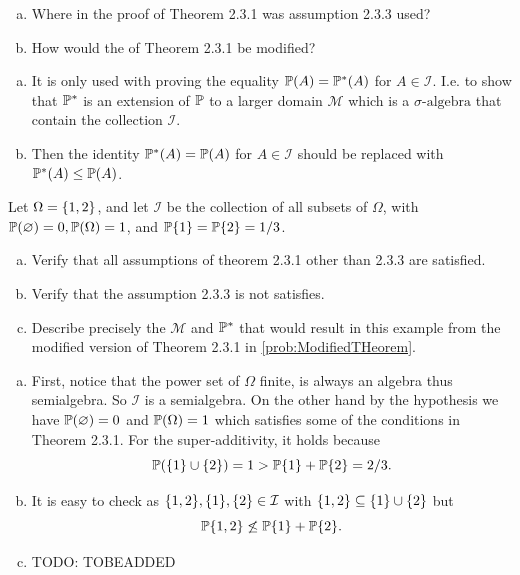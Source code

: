 \begin{problem}
	\label{prob:ModifiedTHeorem}
	\begin{enumerate}[(a)]
		\item Where in the proof of Theorem 2.3.1 was assumption 2.3.3 used?
		\item How would the  of Theorem 2.3.1 be modified?
	\end{enumerate}
\end{problem}
\begin{solution}
	\begin{enumerate}[(a)]
		\item It is only used with proving the equality $ \mathbb{P}(A) = \mathbb{P}^*(A) $ for $ A \in \mathcal{I} $. I.e. to show that $ \mathbb{P}^* $ is an extension of $ \mathbb{P} $ to a larger domain $ \mathcal{M} $ which is a $\sigma\text{-algebra}$ that contain the collection $ \mathcal{I} $.
		\item Then the identity $ \mathbb{P}^*(A) = \mathbb{P}(A) $ for $ A \in \mathcal{I} $ should be replaced with $ \mathbb{P}^*(A) \leq \mathbb{P}(A) $.
 	\end{enumerate}
\end{solution}

\begin{problem}
	Let $ \Omega=\{1,2\} $, and let $ \mathcal{I} $ be the collection of all subsets of $ \Omega $, with $ \mathbb{P}(\varnothing)=0, \mathbb{P}(\Omega) = 1 $, and $ \mathbb{P}\{1\}=\mathbb{P}\{2\} = 1/3 $.
	\begin{enumerate}[(a)]
		\item Verify that all assumptions of theorem 2.3.1 other than 2.3.3 are satisfied.
		\item Verify that the assumption 2.3.3 is not satisfies.
		\item Describe precisely the $ \mathcal{M} $ and $ \mathbb{P}^* $ that would result in this example from the modified version of Theorem 2.3.1 in \autoref{prob:ModifiedTHeorem}.
	\end{enumerate}
\end{problem}
\begin{solution}
	\begin{enumerate}[(a)]
		\item First, notice that the power set of $ \Omega $ finite, is always an algebra thus semialgebra. So $ \mathcal{I} $ is a semialgebra. On the other hand by the hypothesis we have $ \mathbb{P}(\varnothing) = 0 $ and $ \mathbb{P}(\Omega) = 1 $ which satisfies some of the conditions in Theorem 2.3.1. For the super-additivity, it holds because 
		\[ \mathbb{P}(\{1\}\cup\{2\}) = 1 > \mathbb{P}\{1\} + \mathbb{P}\{2\} = 2/3. \]
		\item It is easy to check as $ \{1,2\},\{1\},\{2\} \in \mathcal{I} $ with $ \{1,2\} \subseteq \{1\}\cup \{2\} $ but
		\[ \mathbb{P}\{1,2\} \not\leq \mathbb{P}\{1\}+\mathbb{P}\{2\}.\]
		\item {\color{red} \noindent TODO: TOBEADDED}
	\end{enumerate}
\end{solution}


